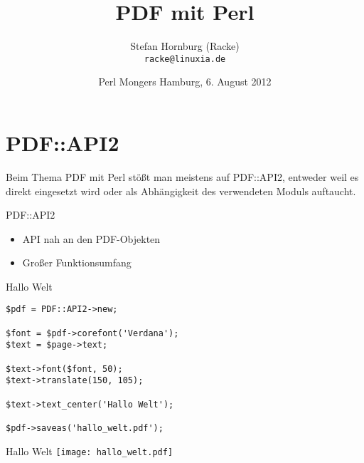 \usepackage[utf8]{inputenc}
\usepackage[T1]{fontenc}
\usepackage{mathptmx}
\usepackage[scaled=.90]{helvet}
\usepackage{courier}

\usepackage{beamerthemesplit}
\usepackage{verbatim}
\usepackage{hyperref}
\usepackage{graphicx}

\usepackage{listings}
\lstset{language=Perl,basicstyle=\footnotesize,tabsize=3,showstringspaces=false}

\title{PDF mit Perl}
\author[racke]{Stefan Hornburg (Racke)\\ \texttt{racke@linuxia.de}}
\date[]{Perl Mongers Hamburg, 6. August 2012}


\maketitle{}

\begin{frame}
  \titlepage
\end{frame}

\tableofcontents

\section{PDF::API2}

Beim Thema PDF mit Perl stößt man meistens auf PDF::API2,
entweder weil es direkt eingesetzt wird oder als Abhängigkeit
des verwendeten Moduls auftaucht.

\begin{frame}{PDF::API2}
\begin{itemize}
\item API nah an den PDF-Objekten
\item Großer Funktionsumfang
\end{itemize}
\end{frame}

\begin{frame}[fragile]{Hallo Welt}
\begin{lstlisting}
$pdf = PDF::API2->new;

$font = $pdf->corefont('Verdana');
$text = $page->text;

$text->font($font, 50);
$text->translate(150, 105);

$text->text_center('Hallo Welt');

$pdf->saveas('hallo_welt.pdf');
\end{lstlisting}
\end{frame}

\begin{frame}{Hallo Welt}
\texttt{[image: hallo\_welt.pdf]}
\end{frame}

